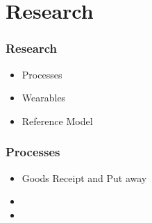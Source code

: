 \section{Research}
\begin{frame}\frametitle{Research}
	\begin{itemize}
		\item Processes
		\item Wearables
		\item Reference Model
	\end{itemize}
\end{frame}

\begin{frame}\frametitle{Processes}
	\begin{itemize}
		\item Goods Receipt and Put away
		\item[]
		\item[]
	\end{itemize}
\end{frame}
